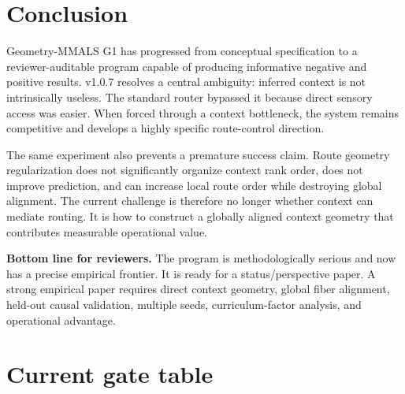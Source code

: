 \documentclass[11pt,a4paper]{article}
\begin{document}
\section{Conclusion}

Geometry-MMALS G1 has progressed from conceptual specification to a reviewer-auditable program capable of producing informative negative and positive results. v1.0.7 resolves a central ambiguity: inferred context is not intrinsically useless. The standard router bypassed it because direct sensory access was easier. When forced through a context bottleneck, the system remains competitive and develops a highly specific route-control direction.

The same experiment also prevents a premature success claim. Route geometry regularization does not significantly organize context rank order, does not improve prediction, and can increase local route order while destroying global alignment. The current challenge is therefore no longer whether context can mediate routing. It is how to construct a globally aligned context geometry that contributes measurable operational value.

\begin{summarybox}
\textbf{Bottom line for reviewers.} The program is methodologically serious and now has a precise empirical frontier. It is ready for a status/perspective paper. A strong empirical paper requires direct context geometry, global fiber alignment, held-out causal validation, multiple seeds, curriculum-factor analysis, and operational advantage.
\end{summarybox}

\appendix
\section{Current gate table}
\end{document}
